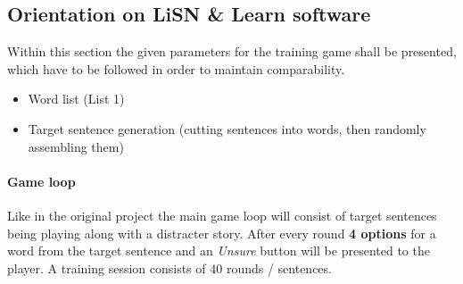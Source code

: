 \documentclass[a4paper,11pt]{article}%
\renewcommand{\\}{\vspace*{0.5\baselineskip} \newline}
\begin{document}
\subsection{Orientation on LiSN \& Learn software}
Within this section the given parameters for the training game shall be presented, which have to be followed in order to maintain comparability.

\begin{itemize}
\item Word list (List 1)
\item Target sentence generation (cutting sentences into words, then randomly assembling them)
\end{itemize}

\paragraph{Game loop} Like in the original project the main game loop will consist of target sentences being playing along with a distracter story. After every round \textbf{4 options} for a word from the target sentence and an \textit{Unsure} button will be presented to the player. A training session consists of 40 rounds / sentences.
\end{document}
